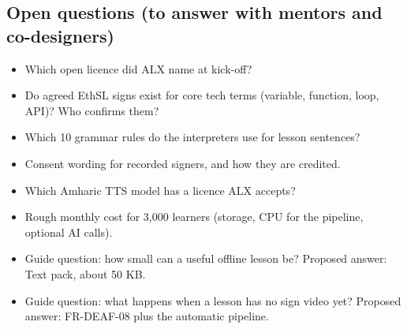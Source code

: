 \documentclass[11pt,a4paper]{article}
\begin{document}
\subsection{Open questions (to answer with mentors and co-designers)}
\begin{itemize}[label=$\square$]
  \item Which open licence did ALX name at kick-off?
  \item Do agreed EthSL signs exist for core tech terms (variable, function, loop, API)? Who confirms them?
  \item Which 10 grammar rules do the interpreters use for lesson sentences?
  \item Consent wording for recorded signers, and how they are credited.
  \item Which Amharic TTS model has a licence ALX accepts?
  \item Rough monthly cost for 3,000 learners (storage, CPU for the pipeline, optional AI calls).
  \item Guide question: how small can a useful offline lesson be? Proposed answer: Text pack, about 50 KB.
  \item Guide question: what happens when a lesson has no sign video yet? Proposed answer: FR-DEAF-08 plus the automatic pipeline.
\end{itemize}
\end{document}
